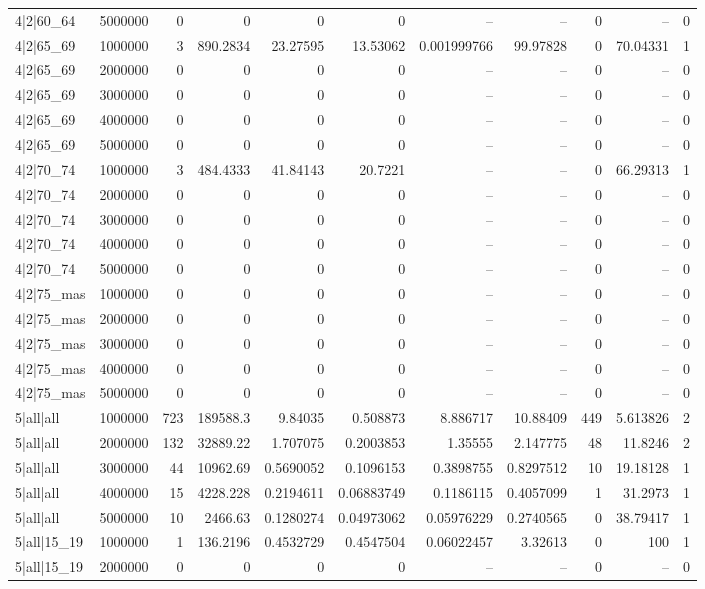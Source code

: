 \begin{tabular}{lrrrrrrrrrr}
4|2|60\_64 & 5000000 & 0 & 0 & 0 & 0 & -- & -- & 0 & -- & 0 \\
4|2|65\_69 & 1000000 & 3 & 890.2834 & 23.27595 & 13.53062 & 0.001999766 & 99.97828 & 0 & 70.04331 & 1 \\
4|2|65\_69 & 2000000 & 0 & 0 & 0 & 0 & -- & -- & 0 & -- & 0 \\
4|2|65\_69 & 3000000 & 0 & 0 & 0 & 0 & -- & -- & 0 & -- & 0 \\
4|2|65\_69 & 4000000 & 0 & 0 & 0 & 0 & -- & -- & 0 & -- & 0 \\
4|2|65\_69 & 5000000 & 0 & 0 & 0 & 0 & -- & -- & 0 & -- & 0 \\
4|2|70\_74 & 1000000 & 3 & 484.4333 & 41.84143 & 20.7221 & -- & -- & 0 & 66.29313 & 1 \\
4|2|70\_74 & 2000000 & 0 & 0 & 0 & 0 & -- & -- & 0 & -- & 0 \\
4|2|70\_74 & 3000000 & 0 & 0 & 0 & 0 & -- & -- & 0 & -- & 0 \\
4|2|70\_74 & 4000000 & 0 & 0 & 0 & 0 & -- & -- & 0 & -- & 0 \\
4|2|70\_74 & 5000000 & 0 & 0 & 0 & 0 & -- & -- & 0 & -- & 0 \\
4|2|75\_mas & 1000000 & 0 & 0 & 0 & 0 & -- & -- & 0 & -- & 0 \\
4|2|75\_mas & 2000000 & 0 & 0 & 0 & 0 & -- & -- & 0 & -- & 0 \\
4|2|75\_mas & 3000000 & 0 & 0 & 0 & 0 & -- & -- & 0 & -- & 0 \\
4|2|75\_mas & 4000000 & 0 & 0 & 0 & 0 & -- & -- & 0 & -- & 0 \\
4|2|75\_mas & 5000000 & 0 & 0 & 0 & 0 & -- & -- & 0 & -- & 0 \\
5|all|all & 1000000 & 723 & 189588.3 & 9.84035 & 0.508873 & 8.886717 & 10.88409 & 449 & 5.613826 & 2 \\
5|all|all & 2000000 & 132 & 32889.22 & 1.707075 & 0.2003853 & 1.35555 & 2.147775 & 48 & 11.8246 & 2 \\
5|all|all & 3000000 & 44 & 10962.69 & 0.5690052 & 0.1096153 & 0.3898755 & 0.8297512 & 10 & 19.18128 & 1 \\
5|all|all & 4000000 & 15 & 4228.228 & 0.2194611 & 0.06883749 & 0.1186115 & 0.4057099 & 1 & 31.2973 & 1 \\
5|all|all & 5000000 & 10 & 2466.63 & 0.1280274 & 0.04973062 & 0.05976229 & 0.2740565 & 0 & 38.79417 & 1 \\
5|all|15\_19 & 1000000 & 1 & 136.2196 & 0.4532729 & 0.4547504 & 0.06022457 & 3.32613 & 0 & 100 & 1 \\
5|all|15\_19 & 2000000 & 0 & 0 & 0 & 0 & -- & -- & 0 & -- & 0 \\

\end{tabular}
